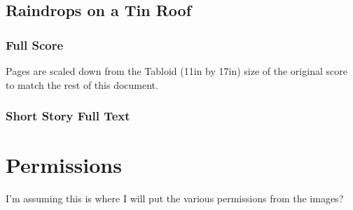 \section{Raindrops on a Tin Roof}

\subsection{Full Score}
Pages are scaled down from the Tabloid (11in by 17in) size of the original score to match the rest of this document. 

 

\subsection{Short Story Full Text}





\chapter{Permissions}

I'm assuming this is where I will put the various permissions from the images?


\backmatter


